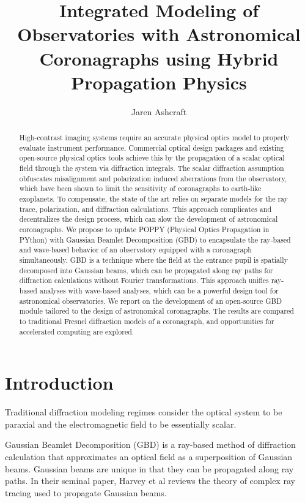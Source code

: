 \documentclass{article}
\title{Integrated Modeling of Observatories with Astronomical Coronagraphs using Hybrid Propagation Physics}
\author{Jaren Ashcraft}
\begin{document}
	\maketitle
	\begin{abstract}
		High-contrast imaging systems require an accurate physical optics model to properly evaluate instrument performance. Commercial optical design packages and existing open-source physical optics tools achieve this by the propagation of a scalar optical field through the system via diffraction integrals. The scalar diffraction assumption obfuscates misalignment and polarization induced aberrations from the observatory, which have been shown to limit the sensitivity of coronagraphs to earth-like exoplanets. To compensate, the state of the art relies on separate models for the ray trace, polarization, and diffraction calculations. This approach complicates and decentralizes the design process, which can slow the development of astronomical coronagraphs. We propose to update POPPY (Physical Optics Propagation in PYthon) with Gaussian Beamlet Decomposition (GBD) to encapsulate the ray-based and wave-based behavior of an observatory equipped with a coronagraph simultaneously. GBD is a technique where the field at the entrance pupil is spatially decomposed into Gaussian beams, which can be propagated along ray paths for diffraction calculations without Fourier transformations. This approach unifies ray-based analyses with wave-based analyses, which can be a powerful design tool for astronomical observatories. We report on the development of an open-source GBD module tailored to the design of astronomical coronagraphs. The results are compared to traditional Fresnel diffraction models of a coronagraph, and opportunities for accelerated computing are explored.
	\end{abstract}
	\section{Introduction}
	
	Traditional diffraction modeling regimes consider the optical system to be paraxial and the electromagnetic field to be essentially scalar. 
	
	Gaussian Beamlet Decomposition (GBD) is a ray-based method of diffraction calculation that approximates an optical field as a superposition of Gaussian beams. Gaussian beams are unique in that they can be propagated along ray paths. In their seminal paper, Harvey et al\cite{Harvey15} reviews the theory of complex ray tracing used to propagate Gaussian beams. 
	
\end{document}
